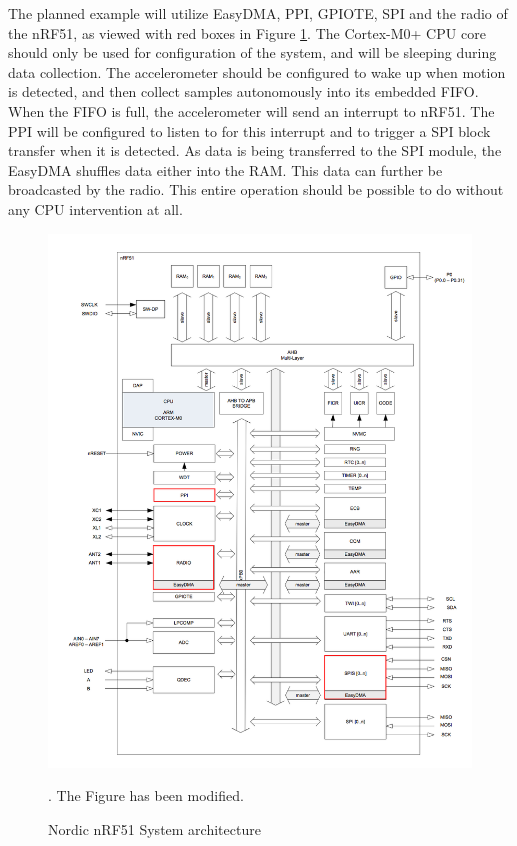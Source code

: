 The planned example will utilize EasyDMA, PPI, GPIOTE, SPI and the radio of the nRF51, as viewed with red boxes in Figure \ref{fig:accel_working_principle}. The Cortex-M0+ CPU core should only be used for configuration of the system, and will be sleeping during data collection. The accelerometer should be configured to wake up when motion is detected, and then collect samples autonomously into its embedded FIFO. When the FIFO is full, the accelerometer will send an interrupt to nRF51. The PPI will be configured to listen to for this interrupt and to trigger a SPI block transfer when it is detected. As data is being transferred to the SPI module, the EasyDMA shuffles data either into the RAM. This data can further be broadcasted by the radio. This entire operation should be possible to do without any CPU intervention at all.

\begin{figure}[h]
\centering
\includegraphics[scale=0.5]{fig/nrf51822_edit.png}
\caption{Nordic nRF51 System architecture \cite{nRF51}}. The Figure has been modified.
\label{fig:accel_working_principle}
\end{figure}